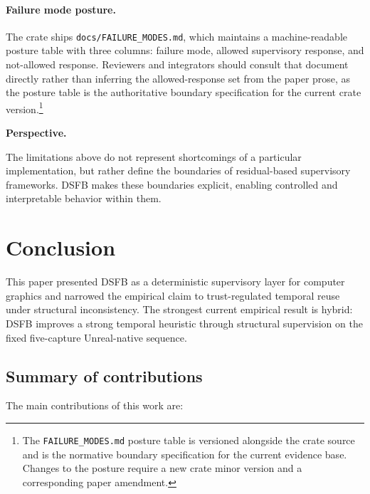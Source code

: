 \documentclass[11pt]{article}
\theoremstyle{definition}
\theoremstyle{plain}
\begin{document}
\paragraph{Failure mode posture.}
The crate ships \texttt{docs/FAILURE\_MODES.md}, which maintains a machine-readable posture table with three columns: failure mode, allowed supervisory response, and not-allowed response. Reviewers and integrators should consult that document directly rather than inferring the allowed-response set from the paper prose, as the posture table is the authoritative boundary specification for the current crate version.\footnote{The \texttt{FAILURE\_MODES.md} posture table is versioned alongside the crate source and is the normative boundary specification for the current evidence base. Changes to the posture require a new crate minor version and a corresponding paper amendment.}

\vspace{0.5em}
\noindent
\textbf{Perspective.}

The limitations above do not represent shortcomings of a particular implementation, but rather define the boundaries of residual-based supervisory frameworks. DSFB makes these boundaries explicit, enabling controlled and interpretable behavior within them.


\section{Conclusion}
\label{sec:conclusion}

This paper presented DSFB as a deterministic supervisory layer for computer graphics and narrowed the empirical claim to trust-regulated temporal reuse under structural inconsistency. The strongest current empirical result is hybrid: DSFB improves a strong temporal heuristic through structural supervision on the fixed five-capture Unreal-native sequence.


\subsection{Summary of contributions}

The main contributions of this work are:
\end{document}
